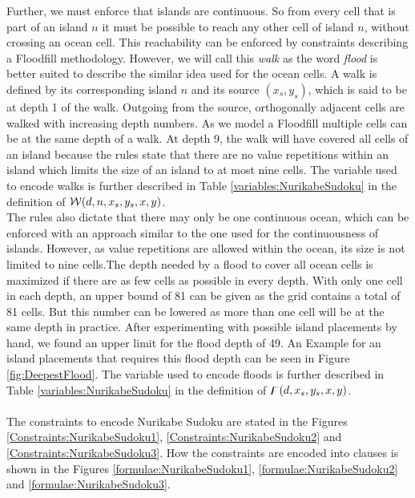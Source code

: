Further, we must enforce that islands are continuous. So from every cell that is part of an island  $n$ it must be possible to reach any other cell of island $n$, without crossing an ocean cell. This reachability can be enforced by constraints describing a Floodfill methodology. However, we will call this \emph{walk} as the word \emph{flood} is better suited to describe the similar idea used for the ocean cells. A walk is defined by its corresponding island $n$ and its source $(x_s,y_s)$, which is said to be at depth 1 of the walk. Outgoing from the source, orthogonally adjacent cells are walked with increasing depth numbers. As we model a Floodfill multiple cells can be at the same depth of a walk. At depth 9, the walk will have covered all cells of an island because the rules state that there are no value repetitions within an island which limits the size of an island to at most nine cells. The variable used to encode walks is further described in Table \ref{variables:NurikabeSudoku} in the definition of $\mathcal{W}(d,n,x_s,y_s,x,y)$.\\

The rules also dictate that there may only be one continuous ocean, which can be enforced with an approach similar to the one used for the continuousness of islands. However, as value repetitions are allowed within the ocean, its size is not limited to nine cells.The depth needed by a flood to cover all ocean cells is maximized if there are as few cells as possible in every depth. With only one cell in each depth, an upper bound of 81 can be given as the grid contains a total of 81 cells. But this number can be lowered as more than one cell will be at the same depth in practice. After experimenting with possible island placements by hand, we found an upper limit for the flood depth of 49. An Example for an island placements that requires this flood depth can be seen in Figure \ref{fig:DeepestFlood}. The variable used to encode floods is further described in Table \ref{variables:NurikabeSudoku} in the definition of $\digamma(d,x_s,y_s,x,y)$.\\
\\
The constraints to encode Nurikabe Sudoku are stated in the Figures \ref{Constraints:NurikabeSudoku1}, \ref{Constraints:NurikabeSudoku2} and \ref{Constraints:NurikabeSudoku3}. How the constraints are encoded into clauses is shown in the Figures \ref{formulae:NurikabeSudoku1}, \ref{formulae:NurikabeSudoku2} and \ref{formulae:NurikabeSudoku3}.\\


